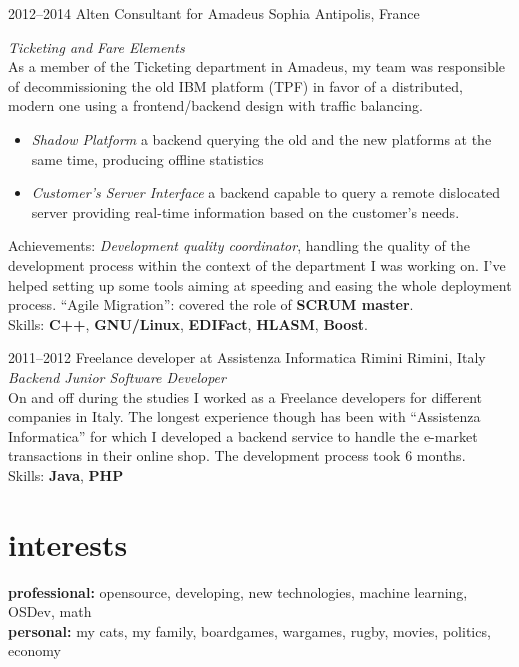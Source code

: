 \documentclass[]{friggeri-cv}
\begin{document}
\begin{entrylist}
  \entry
      {2012--2014}
      {Alten Consultant for Amadeus}
      {Sophia Antipolis, France}
      {\emph{Ticketing and Fare Elements} \\
        As a member of the Ticketing department in Amadeus, my team was
        responsible of decommissioning the old IBM platform (TPF) in favor of a
        distributed, modern one using a frontend/backend design with traffic
        balancing.
        \begin{itemize}
        \item \emph{Shadow Platform} a backend querying the old and the new
          platforms at the same time, producing offline statistics
        \item \emph{Customer's Server Interface} a backend capable to query a
          remote dislocated server providing real-time information based on the
          customer's needs.
        \end{itemize}
        Achievements: \emph{Development quality coordinator}, handling the
        quality of the development process within the context of the department
        I was working on. I've helped setting up some tools aiming at speeding
        and easing the whole deployment process. ``Agile Migration'': covered
        the role of \textbf{SCRUM master}. \\
        Skills: \textbf{C++}, \textbf{GNU/Linux}, \textbf{EDIFact}, \textbf{HLASM}, 
        \textbf{Boost}.
      }
\end{entrylist}

\begin{entrylist}
  \entry
    {2011--2012}
    {Freelance developer at Assistenza Informatica Rimini}
    {Rimini, Italy}
    {\emph{Backend Junior Software Developer} \\
      On and off during the studies I worked as a Freelance developers for
      different companies in Italy.  The longest experience though has been
      with ``Assistenza Informatica'' for which I developed a backend service
      to handle the e-market transactions in their online shop.  The development
      process took 6 months. \\
      Skills: \textbf{Java}, \textbf{PHP}
    }
\end{entrylist}


\section{interests}

\textbf{professional:} opensource, developing, new technologies, machine learning, OSDev, math \\
\textbf{personal:} my cats, my family, boardgames, wargames, rugby, movies, politics, economy
\end{document}
